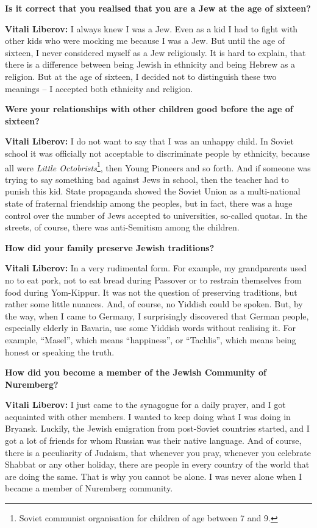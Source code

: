 \textbf{Is it correct that you realised that you are a Jew at the age of sixteen?} 

\textbf{Vitali Liberov:} I always knew I was a Jew. Even as a kid I had to fight with other kids who were mocking me because I was a Jew. But until the age of sixteen, I never considered myself as a Jew religiously. It is hard to explain, that there is a difference between being Jewish in ethnicity and being Hebrew as a religion. But at the age of sixteen, I decided not to distinguish these two meanings – I accepted both ethnicity and religion.  

\textbf{Were your relationships with other children good before the age of sixteen?} 

\textbf{Vitali Liberov:} I do not want to say that I was an unhappy child. In Soviet school it was officially not acceptable to discriminate people by ethnicity, because all were \textit{Little Octobrists}\footnote{Soviet communist organisation for children of age between 7 and 9.}, then Young Pioneers and so forth. And if someone was trying to say something bad against Jews in school, then the teacher had to punish this kid. State propaganda showed the Soviet Union as a multi-national state of fraternal friendship among the peoples, but in fact, there was a huge control over the number of Jews accepted to universities, so-called quotas. In the streets, of course, there was anti-Semitism among the children.  

\textbf{How did your family preserve Jewish traditions?} 

\textbf{Vitali Liberov:} In a very rudimental form. For example, my grandparents used no to eat pork, not to eat bread during Passover or to restrain themselves from food during Yom-Kippur. It was not the question of preserving traditions, but rather some little nuances. And, of course, no Yiddish could be spoken. But, by the way, when I came to Germany, I surprisingly discovered that German people, especially elderly in Bavaria, use some Yiddish words without realising it. For example, ``Masel'', which means ``happiness'', or ``Tachlis'', which means being honest or speaking the truth.  

\textbf{How did you become a member of the Jewish Community of Nuremberg?} 

\textbf{Vitali Liberov:} I just came to the synagogue for a daily prayer, and I got acquainted with other members. I wanted to keep doing what I was doing in Bryansk. Luckily, the Jewish emigration from post-Soviet countries started, and I got a lot of friends for whom Russian was their native language. And of course, there is a peculiarity of Judaism, that whenever you pray, whenever you celebrate Shabbat or any other holiday, there are people in every country of the world that are doing the same. That is why you cannot be alone. I was never alone when I became a member of Nuremberg community.  

